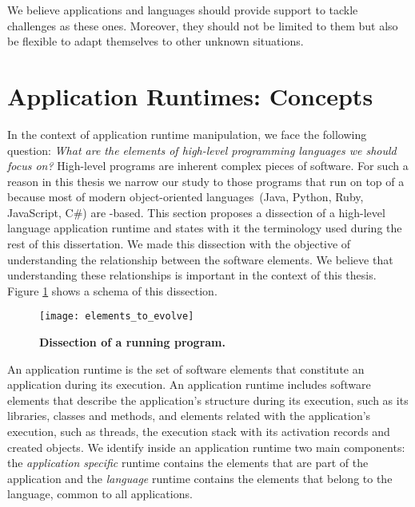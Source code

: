 We believe applications and languages should provide support to tackle challenges as these ones. Moreover, they should not be limited to them but also be flexible to adapt themselves to other unknown situations.

\section{Application Runtimes: Concepts}

In the context of application runtime manipulation, we face the following question: \emph{What are the elements of high-level programming languages we should focus on?} High-level programs are inherent complex pieces of software. For such a reason in this thesis we narrow our study to those programs that run on top of a \VM because most of modern object-oriented languages~(\eg Java, Python, Ruby, JavaScript, C\#) are \VM-based.
This section proposes a dissection of a high-level language application runtime and states with it the terminology used during the rest of this dissertation. We made this dissection with the objective of understanding the relationship between the software elements. We believe that understanding these relationships is important in the context of this thesis. Figure \ref{fig:whatToEvolve} shows a schema of this dissection.

\begin{figure}[!ht]
\begin{center}
\texttt{[image: elements\_to\_evolve]}
\caption{\textbf{Dissection of a running program.}\label{fig:whatToEvolve} }
\end{center}
\end{figure}

An application runtime is the set of software elements that constitute an application during its execution. An application runtime includes software elements that describe the application's structure during its execution, such as its libraries, classes and methods, and elements related with the application's execution, such as threads, the execution stack with its activation records and created objects. We identify inside an application runtime two main components: the \emph{application specific} runtime contains the elements that are part of the application and the \emph{language} runtime contains the elements that belong to the language, common to all applications.

